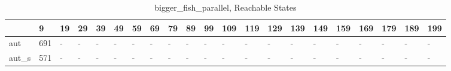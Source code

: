 \begin{table}
\caption{bigger_fish_parallel, Reachable States}
\label{bigger_fish_parallel_reach}
\begin{tabular}{lllllllllllllllllllll}
\toprule
 & 9 & 19 & 29 & 39 & 49 & 59 & 69 & 79 & 89 & 99 & 109 & 119 & 129 & 139 & 149 & 159 & 169 & 179 & 189 & 199 \\
\midrule
aut & 691 & - & - & - & - & - & - & - & - & - & - & - & - & - & - & - & - & - & - & - \\
aut_s & 571 & - & - & - & - & - & - & - & - & - & - & - & - & - & - & - & - & - & - & - \\
\bottomrule
\end{tabular}
\end{table}
